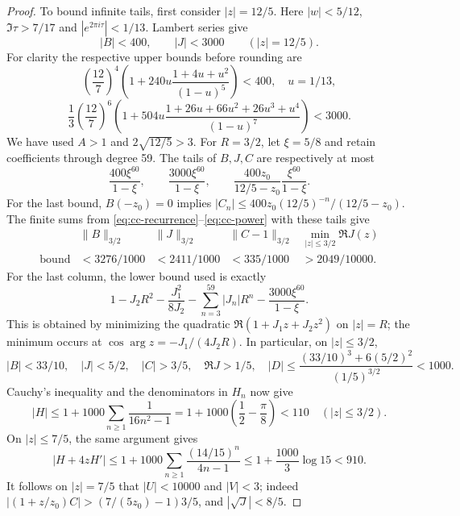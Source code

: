 \begin{proof}
To bound infinite tails, first consider $|z|=12/5$.
Here $|w|<5/12$, $\Im\tau>7/17$ and
$|e^{2\pi i\tau}|<1/13$. Lambert series give
\begin{equation}\label{eq:cc-outer}
 |B|<400,\qquad |J|<3000\qquad (|z|=12/5).
\end{equation}
For clarity the respective upper bounds before rounding are
\[
 \left(\frac{12}{7}\right)^4
 \left(1+240u\frac{1+4u+u^2}{(1-u)^5}\right)<400,
 \quad u=1/13,
\]
\[
 \frac13\left(\frac{12}{7}\right)^6
 \left(1+504u\frac{1+26u+66u^2+26u^3+u^4}{(1-u)^7}\right)<3000.
\]
We have used $A>1$ and $2\sqrt{12/5}>3$.
For $R=3/2$, let $\xi=5/8$ and retain coefficients through
degree 59. The tails of $B,J,C$ are respectively at most
\begin{equation}\label{eq:cc-tail60}
 \frac{400\xi^{60}}{1-\xi},\qquad
 \frac{3000\xi^{60}}{1-\xi},\qquad
 \frac{400z_0}{12/5-z_0}\frac{\xi^{60}}{1-\xi}.
\end{equation}
For the last bound, $B(-z_0)=0$ implies
$|C_n|\le400z_0(12/5)^{-n}/(12/5-z_0)$.
The finite sums from \eqref{eq:cc-recurrence}--\eqref{eq:cc-power}
with these tails give
\[
 \begin{array}{c|cccc}
 &\|B\|_{3/2}&\|J\|_{3/2}&\|C-1\|_{3/2}
                   &\min_{|z|\le3/2}\Re J(z)\\ \hline
 \text{bound}&<3276/1000&<2411/1000&<335/1000&>2049/10000.
 \end{array}
\]
For the last column, the lower bound used is exactly
\[
 1-J_2R^2-\frac{J_1^2}{8J_2}
       -\sum_{n=3}^{59}|J_n|R^n-
                   \frac{3000\xi^{60}}{1-\xi}.
\]
This is obtained by minimizing the quadratic
$\Re(1+J_1z+J_2z^2)$ on $|z|=R$; the minimum occurs at
$\cos\arg z=-J_1/(4J_2R)$. In particular, on $|z|\le3/2$,
\[
 |B|<33/10,\quad |J|<5/2,\quad |C|>3/5,\quad
 \Re J>1/5,\quad
 |D|\le\frac{(33/10)^3+6(5/2)^2}{(1/5)^{3/2}}<1000.
\]
Cauchy's inequality and the denominators in $H_n$ now give
\[
 |H|\le1+1000\sum_{n\ge1}\frac1{16n^2-1}
       =1+1000\left(\frac12-\frac\pi8\right)<110
                      \quad (|z|\le3/2).
\]
On $|z|\le7/5$, the same argument gives
\[
 |H+4zH'|\le1+1000\sum_{n\ge1}
                 \frac{(14/15)^n}{4n-1}
       \le1+\frac{1000}{3}\log15<910.
\]
It follows on $|z|=7/5$ that $|U|<10000$ and $|V|<3$;
indeed $|(1+z/z_0)C|>(7/(5z_0)-1)3/5$, and
$|\sqrt J|<8/5$.


\end{proof}
